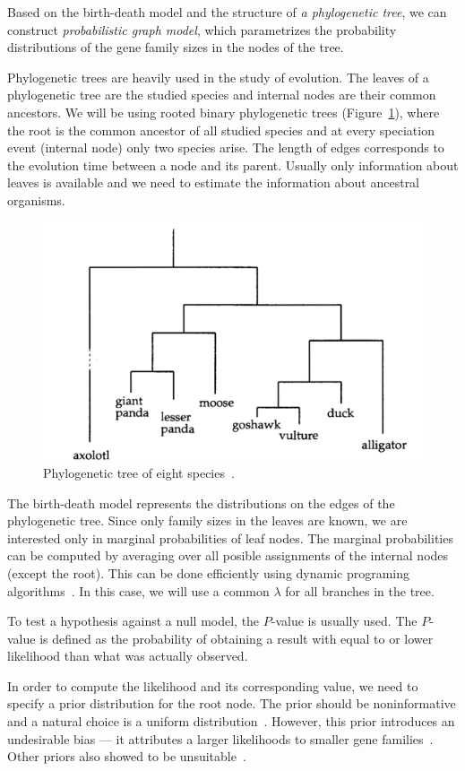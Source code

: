 Based on the birth-death model and the structure of \emph{a phylogenetic tree}, we can construct \emph{probabilistic graph model}, which parametrizes the probability distributions of the gene family sizes in the nodes of the tree.

Phylogenetic trees are heavily used in the study of evolution. The leaves of a phylogenetic tree are the studied species and internal nodes are their common ancestors. We will be using rooted binary phylogenetic trees (Figure~\ref{fig:phylogenetic-tree}), where the root is the common ancestor of all studied species and at every speciation event (internal node) only two species arise. The length of edges corresponds to the evolution time between a node and its parent. Usually only information about leaves is available and we need to estimate the information about ancestral organisms.

\begin{figure}[htbp]
  \centering
  \includegraphics[width=.5\textwidth]{../figures/phylogenetic_tree}
  \caption[Phylogenetic tree]{Phylogenetic tree of eight species~\cite{durbin}.}\label{fig:phylogenetic-tree}
\end{figure}

The birth-death model represents the distributions on the edges of the phylogenetic tree. Since only family sizes in the leaves are known, we are interested only in marginal probabilities of leaf nodes. The marginal probabilities can be computed by averaging over all posible assignments of the internal nodes (except the root). This can be done efficiently using dynamic programing algorithms~\cite{felsenstein1981evolutionary}. In this case, we will use a common $\lambda$ for all branches in the tree.

To test a hypothesis against a null model, the $P$-value is usually used. The $P$-value is defined as the probability of obtaining a result with equal to or lower likelihood than what was actually observed.

In order to compute the likelihood and its corresponding value, we need to specify a prior distribution for the root node. The prior should be noninformative and a natural choice is a uniform distribution~\cite{felsenstein1981evolutionary}. However, this prior introduces an undesirable bias --- it attributes a larger likelihoods to smaller gene families~\cite{hahn2005estimating}. Other priors also showed to be unsuitable~\cite{hahn2005estimating}.

